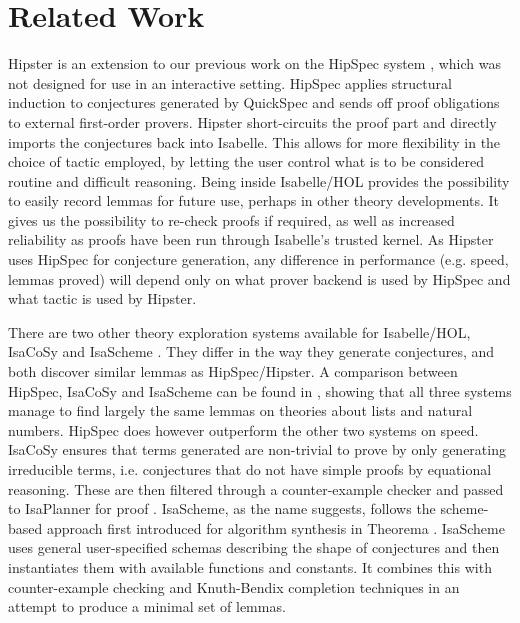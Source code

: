 \section{Related Work}
\label{sec:related}

Hipster is an extension to our previous work on the HipSpec system \cite{hipspecCADE}, which was not designed for use in an interactive setting. HipSpec applies structural induction to conjectures generated by QuickSpec and sends off proof obligations to external first-order provers. Hipster short-circuits the proof part and directly imports the conjectures back into Isabelle. This allows for more flexibility in the choice of tactic employed, by letting the user control what is to be considered routine and difficult reasoning. Being inside Isabelle/HOL provides the possibility to easily record lemmas for future use, perhaps in other theory developments. It gives us the possibility to re-check proofs if required, as well as increased reliability as proofs have been run through Isabelle's trusted kernel. As Hipster uses HipSpec for conjecture generation, any difference in performance (e.g. speed, lemmas proved) will depend only on what prover backend is used by HipSpec and what tactic is used by Hipster. %

There are two other theory exploration systems available for Isabelle/HOL, IsaCoSy \cite{isacosy} and IsaScheme \cite{isascheme}. They differ in the way they generate conjectures, and both discover similar lemmas as HipSpec/Hipster. A comparison between HipSpec, IsaCoSy and IsaScheme can be found in \cite{hipspecCADE}, showing that all three systems manage to find largely the same lemmas on theories about lists and natural numbers. HipSpec does however outperform the other two systems on speed.
IsaCoSy ensures that terms generated are non-trivial to prove by only generating irreducible terms, i.e. conjectures that do not have simple proofs by equational reasoning. These are then filtered through a counter-example checker and passed to IsaPlanner for proof \cite{isaplanner}. IsaScheme, as the name suggests, follows the scheme-based approach first introduced for algorithm synthesis in Theorema \cite{theorema}. IsaScheme uses general user-specified schemas describing the shape of conjectures and then instantiates them with available functions and constants. It combines this with counter-example checking and Knuth-Bendix completion techniques in an attempt to produce a minimal set of lemmas. 


